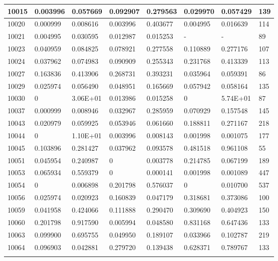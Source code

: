 \begin{table}[H]
{\begin{tabular}{|l|l|l|l|l|l|l|l|}
				10015 & 0.003996 & 0.057669 & 0.092907 & 0.279563 & 0.029970 & 0.057429 & 139 \\ \hline
				10020 & 0.000999 & 0.008616 & 0.003996 & 0.403677 & 0.004995 & 0.016639 & 114 \\ \hline
				10021 & 0.004995 & 0.030595 & 0.012987 & 0.015253 & - & - & 89 \\ \hline
				10023 & 0.040959 & 0.084825 & 0.078921 & 0.277558 & 0.110889 & 0.277176 & 107 \\ \hline
				10024 & 0.037962 & 0.074983 & 0.090909 & 0.255343 & 0.231768 & 0.413339 & 113 \\ \hline
				10027 & 0.163836 & 0.413906 & 0.268731 & 0.393231 & 0.035964 & 0.059391 & 86 \\ \hline
				10029 & 0.025974 & 0.056490 & 0.048951 & 0.165669 & 0.057942 & 0.058164 & 135 \\ \hline
				10030 & 0 & 3.06E+01 & 0.013986 & 0.015258 & 0 & 5.74E+01 & 87 \\ \hline
				10037 & 0.000999 & 0.008946 & 0.032967 & 0.285959 & 0.070929 & 0.157548 & 145 \\ \hline
				10043 & 0.020979 & 0.059925 & 0.053946 & 0.061660 & 0.188811 & 0.271167 & 218 \\ \hline
				10044 & 0 & 1.10E+01 & 0.003996 & 0.008143 & 0.001998 & 0.001075 & 177 \\ \hline
				10045 & 0.103896 & 0.281427 & 0.037962 & 0.093578 & 0.481518 & 0.961108 & 55 \\ \hline
				10051 & 0.045954 & 0.240987 & 0 & 0.003778 & 0.214785 & 0.067199 & 189 \\ \hline
				10053 & 0.065934 & 0.559379 & 0 & 0.000141 & 0.001998 & 0.001089 & 447 \\ \hline
				10054 & 0 & 0.006898 & 0.201798 & 0.576037 & 0 & 0.010700 & 537 \\ \hline
				10056 & 0.025974 & 0.020923 & 0.160839 & 0.047179 & 0.318681 & 0.373086 & 100 \\ \hline
				10059 & 0.041958 & 0.424066 & 0.111888 & 0.290470 & 0.309690 & 0.404923 & 150 \\ \hline
				10060 & 0.201798 & 0.917590 & 0.005994 & 0.048580 & 0.831168 & 0.647436 & 133 \\ \hline
				10063 & 0.099900 & 0.695755 & 0.049950 & 0.189107 & 0.033966 & 0.102787 & 219 \\ \hline
				10064 & 0.096903 & 0.042881 & 0.279720 & 0.139438 & 0.628371 & 0.789767 & 133 \\ \hline

\label{tab:nosocsI}
\end{tabular}
}
\end{table}

